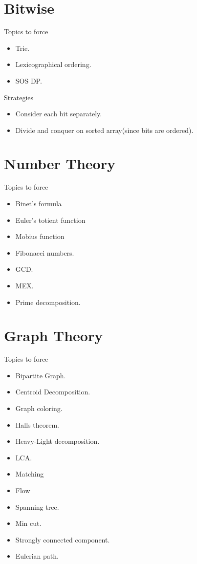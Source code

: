 \documentclass[../Notes.tex]{subfiles}
\begin{document}
\section{Bitwise}
Topics to force
\begin{itemize}
	\item Trie.
	\item Lexicographical ordering.
	\item SOS DP.
\end{itemize}

Strategies
\begin{itemize}
	\item Consider each bit separately.
	\item Divide and conquer on sorted array(since bits are ordered).
\end{itemize}
\section{Number Theory}
Topics to force
\begin{itemize}
	\item Binet's formula
	\item Euler's totient function
	\item Mobius function
	\item Fibonacci numbers.
	\item GCD.
	\item MEX.
	\item Prime decomposition.
\end{itemize}

\section{Graph Theory}
Topics to force
\begin{itemize}
	\item Bipartite Graph.
	\item Centroid Decomposition.
	\item Graph coloring.
	\item Halls theorem.
	\item Heavy-Light decomposition.
	\item LCA.
	\item Matching
	\item Flow
	\item Spanning tree.
	\item Min cut.
	\item Strongly connected component.
	\item Eulerian path.
\end{itemize}
\end{document}
